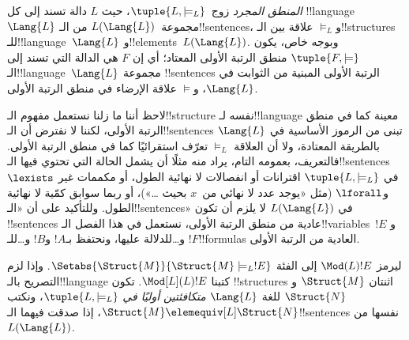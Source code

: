 \documentclass[../../../include/open-logic-section]{subfiles}
\begin{document}

\begin{defn}
\emph{المنطق المجرد} زوج~$\tuple{L,\models_L}$، حيث $L$ دالة تسند إلى
كل !!{language}~$\Lang{L}$ مجموعة~$L(\Lang{L})$ من الـ!!{sentence}s،
و$\models_L$ علاقة بين الـ!!{structure}s للـ!!{language}~$\Lang{L}$
و!!{element}s~$L(\Lang{L})$. وبوجه خاص، يكون
$\tuple{F,\models}$ منطق الرتبة الأولى المعتاد؛ أي إن $F$ هي الدالة
التي تسند إلى الـ!!{language}~$\Lang{L}$ مجموعة !!{sentence}s الرتبة
الأولى المبنية من الثوابت في $\Lang{L}$، و$\models$ علاقة الإرضاء في
منطق الرتبة الأولى.
\end{defn}

لاحظ أننا ما زلنا نستعمل مفهوم الـ!!{structure} نفسه لـ!!{language}
معينة كما في منطق الرتبة الأولى، لكننا لا نفترض أن الـ!!{sentence}s تبنى
من الرموز الأساسية في $\Lang{L}$ بالطريقة المعتادة، ولا أن العلاقة
$\models_L$ تعرّف استقرائيًا كما في منطق الرتبة الأولى. فالتعريف، بعمومه
التام، يراد منه مثلًا أن يشمل الحالة التي تحتوي فيها الـ!!{sentence}s في
$\tuple{L,\models_L}$ اقترانات أو انفصالات لا نهائية الطول، أو مكممات
غير $\lexists$ و$\lforall$ (مثل «يوجد عدد لا نهائي من~$x$ بحيث
\dots»)، أو ربما سوابق كمّية لا نهائية الطول. وللتأكيد على أن
«الـ!!{sentence}s» في $L(\Lang{L})$ لا يلزم أن تكون !!{sentence}s
عادية من منطق الرتبة الأولى، نستعمل في هذا الفصل الـ!!{variable}s~$!E$
و$!F$ و\dots للدلالة عليها، ونحتفظ بـ$!A$ و$!B$ و\dots للـ!!{formula}s
العادية من الرتبة الأولى.

\begin{defn}
ليرمز $\Mod(L){!E}$ إلى الفئة
$\Setabs{\Struct{M}}{\Struct{M} \models_L !E}$. وإذا لزم التصريح
بالـ!!{language} كتبنا $\Mod[L](L){!E}$. تكون !!{structure}s اثنتان
$\Struct{M}$ و$\Struct{N}$ للغة $\Lang{L}$ \emph{متكافئتين أوليًا في}
$\tuple{L,\models_L}$، ونكتب
$\Struct{M} \elemequiv[L] \Struct{N}$، إذا صدقت فيهما الـ!!{sentence}s
نفسها من $L(\Lang{L})$.
\end{defn}
\end{document}
